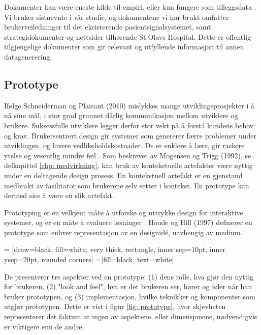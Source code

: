 \noindent
Dokumenter kan være eneste kilde til empiri, eller kun fungere som tilleggsdata \cite{Tjora}. Vi bruker sistnevnte i vår studie, og dokumentene vi har brukt omfatter brukerveiledninger til det eksisterende pasientsignalsystemet, samt strategidokumenter og nettsider tilhørende St.Olavs Hospital. Dette er offentlig tilgjengelige dokumenter som gir relevant og utfyllende informasjon til annen datagenerering.


\subsection{Prototype}
Ifølge Schneiderman og Plaisant (2010) mislykkes mange utviklingsprosjekter i å nå sine mål, i stor grad grunnet dårlig kommunikasjon mellom utviklere og brukere. Suksessfulle utviklere legger derfor stor vekt på å forstå kundens behov og krav. 
Brukersentrert design gir systemer som genererer færre problemer under utviklingen, og lavere vedlikeholdskostnader. De er enklere å lære, gir raskere ytelse og vesentlig mindre feil \cite{mmi}.
Som beskrevet av Mogensen og Trigg (1992), se delkapittel \ref{chp: medvirkning}, kan bruk av kontekstuelle artefakter være nyttig under en deltagende design prosess. En kontekstuell artefakt er en gjenstand medbrakt av fasilitator som brukerene selv setter i kontekst. En prototype kan dermed sies å være en slik artefakt. 

\noindent
Prototyping er en velkjent måte å utforske og uttrykke design for interaktive systemer, og er en måte å evaluere løsninger \cite{Houde97}. Houde og Hill (1997) definerer en prototype som enhver representasjon av en designidé, uavhengig av medium. 

 = [draw=black, fill=white, very thick,
    rectangle, inner sep=10pt, inner ysep=20pt, rounded corners]
 =[fill=black, text=white]
%

\noindent
De presenterer tre aspekter ved en prototype; (1) dens rolle, hva gjør den nyttig for brukeren, (2) "look and feel", hva er det brukeren ser, hører og føler når han bruker prototypen, og (3) implementasjon, hvilke teknikker og komponenter som utgjør prototypen. Dette er vist i figur \ref{fig: prototype}, hvor skjevheten representerer det faktum at ingen av aspektene, eller dimensjonene, nødvendigvis er viktigere enn de andre.

